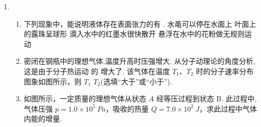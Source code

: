 \begin{enumerate}
\begin{enumerate}


\end{enumerate}

\item 
{}
\begin{enumerate}
	\item
下列现象中，能说明液体存在表面张力的有 \underlinegap .
\fourchoices
{水黾可以停在水面上}
{叶面上的露珠呈球形}
{滴入水中的红墨水很快散开}
{悬浮在水中的花粉做无规则运动}



\item 
密闭在钢瓶中的理想气体,温度升高时压强增大. 从分子动理论的角度分析,这是由于分子热运动
的 \underlinegap 增大了. 该气体在温度 $ T_{1} $、$ T_{2} $ 时的分子速率分布图象如图所示，则
$ T_{1} $ \underlinegap $ T_{2} $(选填“大于”或“小于”).
\begin{figure}[h!]
	\centering
	
\end{figure}


\item 
如图所示，一定质量的理想气体从状态 $ A $ 经等压过程到状态 B. 此过程中,气体压强
$ p=1.0 \times 10^{5} \ Pa $，吸收的热量 $ Q=7.0 \times 10^{2} \ J $，求此过程中气体内能的增量.
\begin{figure}[h!]
	\flushright
	
\end{figure}




\end{enumerate}
\end{enumerate}
